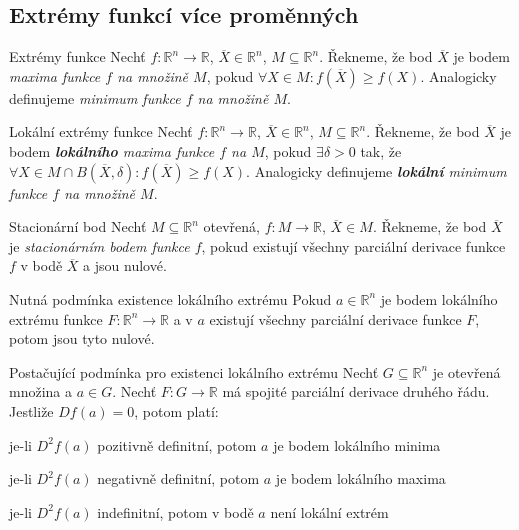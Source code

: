 \subsection{Extrémy funkcí více proměnných}

\begin{definiceN}{Extrémy funkce}
Nechť $f: \mathbb{R}^n \rightarrow \mathbb{R}$, $\overline{X} \in \mathbb{R}^n$, $M \subseteq \mathbb{R}^n$. Řekneme, že bod $\overline{X}$ je bodem \textit{maxima funkce $f$ na množině $M$}, pokud $\forall X \in M: f(\overline{X}) \geq f(X) $. Analogicky definujeme \textit{minimum funkce $f$ na množině $M$}.
\end{definiceN}

\begin{definiceN}{Lokální extrémy funkce}
Nechť $f: \mathbb{R}^n \rightarrow \mathbb{R}$, $\overline{X} \in \mathbb{R}^n$, $M \subseteq \mathbb{R}^n$. Řekneme, že bod $\overline{X}$ je bodem \textit{\textbf{lokálního} maxima funkce $f$ na $M$}, pokud $\exists \delta > 0$ tak, že $\forall X \in M \cap B(\overline{X}, \delta): f(\overline{X}) \geq f(X) $. Analogicky definujeme \textit{\textbf{lokální} minimum funkce $f$ na množině $M$}.
\end{definiceN}

\begin{definiceN}{Stacionární bod}
Nechť $M \subseteq \mathbb{R}^n$ otevřená, $f: M \rightarrow \mathbb{R}$, $\overline{X} \in M$. Řekneme, že bod $\overline{X}$ je \textit{stacionárním bodem funkce $f$}, pokud existují všechny parciální derivace funkce $f$ v bodě $\overline{X}$ a jsou nulové.
\end{definiceN}

\begin{vetaN}{Nutná podmínka existence lokálního extrému}
Pokud $a \in \mathbb{R}^n$ je bodem lokálního extrému funkce $F: \mathbb{R}^n \rightarrow \mathbb{R}$ a v $a$ existují všechny parciální derivace funkce $F$, potom jsou tyto nulové.
\end{vetaN}

\begin{vetaN}{Postačující podmínka pro existenci lokálního extrému}
Nechť $G \subseteq \mathbb{R}^n$ je otevřená množina a $a \in G$. Nechť $F: G \rightarrow \mathbb{R}$ má spojité parciální derivace druhého řádu. Jestliže $Df(a) = 0$, potom platí:
\begin{pitemize}
\item je-li $D^2f(a)$ pozitivně definitní, potom $a$ je bodem lokálního minima
\item je-li $D^2f(a)$ negativně definitní, potom $a$ je bodem lokálního maxima
\item je-li $D^2f(a)$ indefinitní, potom v bodě $a$ není lokální extrém
\end{pitemize}
\end{vetaN}

